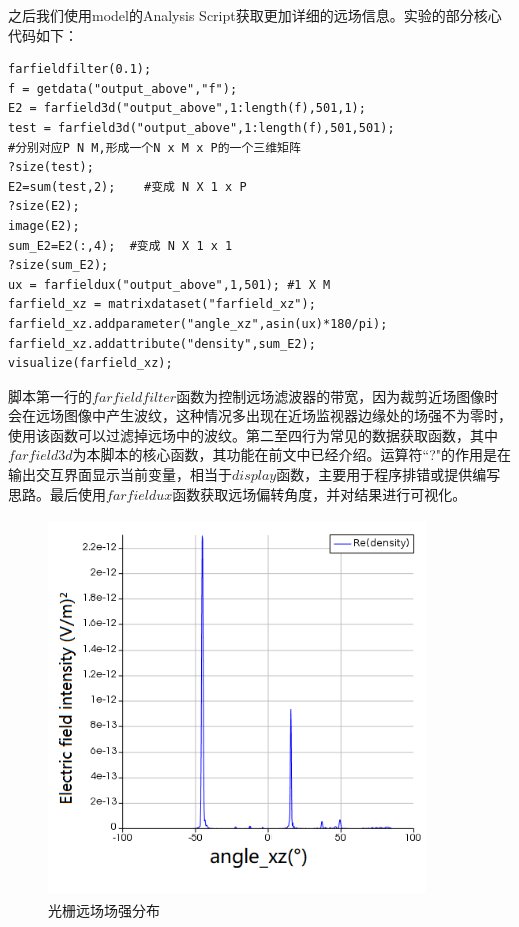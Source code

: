 \documentclass[UTF8,a4paper,12pt]{ctexart}
\numberwithin{equation}{section}
\begin{document}
之后我们使用model的Analysis
 Script获取更加详细的远场信息。实验的部分核心代码如下：
 \begin{lstlisting}
farfieldfilter(0.1);
f = getdata("output_above","f");   
E2 = farfield3d("output_above",1:length(f),501,1);
test = farfield3d("output_above",1:length(f),501,501);   
#分别对应P N M,形成一个N x M x P的一个三维矩阵
?size(test);
E2=sum(test,2);    #变成 N X 1 x P
?size(E2);
image(E2);
sum_E2=E2(:,4);  #变成 N X 1 x 1
?size(sum_E2);
ux = farfieldux("output_above",1,501); #1 X M   
farfield_xz = matrixdataset("farfield_xz");
farfield_xz.addparameter("angle_xz",asin(ux)*180/pi);
farfield_xz.addattribute("density",sum_E2);
visualize(farfield_xz);
\end{lstlisting}

 脚本第一行的$farfieldfilter$函数为控制远场滤波器的带宽，因为裁剪近场图像时会在远场图像中产生波纹，这种情况多出现在近场监视器边缘处的场强不为零时，使用该函数可以过滤掉远场中的波纹。第二至四行为常见的数据获取函数，其中$farfield3d$为本脚本的核心函数，其功能在前文中已经介绍。运算符``?"的作用是在输出交互界面显示当前变量，相当于$display$函数，主要用于程序排错或提供编写思路。最后使用$farfieldux$函数获取远场偏转角度，并对结果进行可视化。
 \begin{figure}[htbp]
\centering
\includegraphics[height=10cm,width=10cm]{fig18.png}
\caption{光栅远场场强分布}
\label{3-11}
\end{figure}
 
\end{document}
